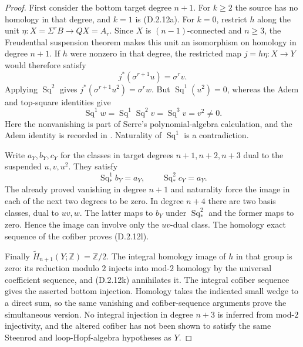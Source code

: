 \begin{proof}
First consider the bottom target degree $n+1$. For $k\geq2$
the source has no homology in that degree, and $k=1$ is
\textup{(D.2.12a)}. For $k=0$, restrict $h$ along the unit
$\eta:X=\Sigma^rB\to QX=A_r$. Since $X$ is
$(n-1)$-connected and $n\geq3$, the Freudenthal suspension
theorem makes this unit an isomorphism on homology in degree
$n+1$. If $h$ were nonzero in that degree, the restricted map
$j=h\eta:X\to Y$ would therefore satisfy
\[
 j^*(\sigma^{r+1}u)=\sigma^rv.
\]
Applying $\operatorname{Sq}^2$ gives
$j^*(\sigma^{r+1}u^2)=\sigma^rw$.
But $\operatorname{Sq}^1(u^2)=0$, whereas the Adem and
top-square identities give
\[
 \operatorname{Sq}^1w
 =\operatorname{Sq}^1\operatorname{Sq}^2v
 =\operatorname{Sq}^3v=v^2\ne0.
\]
Here the nonvanishing is part of Serre's polynomial-algebra
calculation, and the Adem identity is recorded in
\cite[\S4, no.~32.2, p.~224]{I_Serre1953}.
Naturality of $\operatorname{Sq}^1$ is a contradiction.

Write $a_Y,b_Y,c_Y$ for the classes in target degrees
$n+1,n+2,n+3$ dual to the suspended $u,v,u^2$.
They satisfy
\[
 \operatorname{Sq}_*^1b_Y=a_Y,
 \qquad\operatorname{Sq}_*^2c_Y=a_Y.
\]
The already proved vanishing in degree $n+1$ and naturality
force the image in each of the next two degrees to be zero.
In degree $n+4$ there are two basis classes, dual to $uv,w$.
The latter maps to $b_Y$ under $\operatorname{Sq}_*^2$ and
the former maps to zero. Hence the image can involve only
the $uv$-dual class. The homology exact sequence of the
cofiber proves \textup{(D.2.12l)}.

Finally $\widetilde H_{n+1}(Y;\mathbb Z)=\mathbb Z/2$.
The integral homology image of $h$ in that group is zero:
its reduction modulo $2$ injects into mod-$2$ homology by
the universal coefficient sequence, and
\textup{(D.2.12k)} annihilates it. The integral cofiber
sequence gives the asserted bottom injection. Homology takes
the indicated small wedge to a direct sum, so the same
vanishing and cofiber-sequence arguments prove the simultaneous
version. No integral
injection in degree $n+3$ is inferred from mod-$2$
injectivity, and the altered cofiber has not been shown to
satisfy the same Steenrod and loop-Hopf-algebra hypotheses
as $Y$.
\end{proof}
